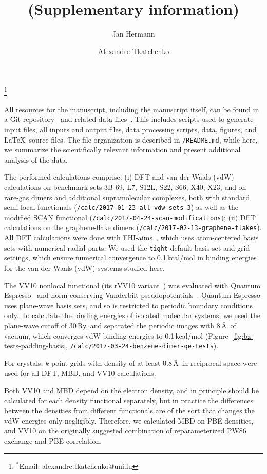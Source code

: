 \documentclass[twocolumn]{article}
\title{\\(Supplementary information)}
\author[1,2]{Jan Hermann}
\author[2,*]{Alexandre Tkatchenko}
\affil[1]{Fritz-Haber-Institut der Max-Planck-Gesellschaft, Faradayweg 4--6, 14195 Berlin, Germany}
\affil[2]{Physics and Materials Science Research Unit, University of Luxembourg, 162A Avenue de la Faïencerie, L-1511 Luxembourg}
\date{}
\renewcommand\cite{\citep}
\begin{document}
\nocite{achemso-control}

\maketitle

\begingroup
\renewcommand\thefootnote{}\footnote{$^*$Email: alexandre.tkatchenko@uni.lu}%
\addtocounter{footnote}{-1}%
\endgroup
All resources for the manuscript, including the manuscript itself, can be found in a Git repository~\cite{GitRepo} and related data files~\cite{DataH5,DataCaf}.
This includes scripts used to generate input files, all inputs and output files, data processing scripts, data, figures, and \LaTeX\ source files.
The file organization is described in \verb+/README.md+, while here, we summarize the scientifically relevant information and present additional analysis of the data.

The performed calculations comprise:
(i) DFT and van der Waals (vdW) calculations on benchmark sets 3B-69, L7, S12L, S22, S66, X40, X23, and on rare-gas dimers and additional supramolecular complexes, both with standard semi-local functionals (\verb+/calc/2017-01-23-all-vdw-sets-3+) as well as the modified SCAN functional (\verb+/calc/2017-04-24-scan-modifications+);
(ii) DFT calculations on the graphene-flake dimers (\verb+/calc/2017-02-13-graphene-flakes+).
All DFT calculations were done with FHI-aims~\cite{BlumCPC09}, which uses atom-centered basis sets with numerical radial parts.
We used the \verb+tight+ default basis set and grid settings, which ensure numerical convergence to 0.1\,kcal/mol in binding energies for the van der Waals (vdW) systems studied here.

The VV10 nonlocal functional (its rVV10 variant~\cite{SabatiniPRB13}) was evaluated with Quantum Espresso~\cite{GiannozziJPCM09} and norm-conserving Vanderbilt pseudopotentials~\cite{HamannPRB13}.
Quantum Espresso uses plane-wave basis sets, and so is restricted to periodic boundary conditions only.
To calculate the binding energies of isolated molecular systems, we used the plane-wave cutoff of 30\,Ry, and separated the periodic images with 8\,\AA\ of vacuum, which converges vdW binding energies to 0.1\,kcal/mol (Figure~\ref{fig:bz-tests-padding-basis}, \verb+/calc/2017-03-24-benzene-dimer-qe-tests+).

For crystals, $k$-point grids with density of at least 0.8\,\AA\ in reciprocal space were used for all DFT, MBD, and VV10 calculations.

Both VV10 and MBD depend on the electron density, and in principle should be calculated for each density functional separately, but in practice the differences between the densities from different functionals are of the sort that changes the vdW energies only negligibly.
Therefore, we calculated MBD on PBE densities, and VV10 on the originally suggested combination of reparameterized PW86 exchange and PBE correlation.
\end{document}
